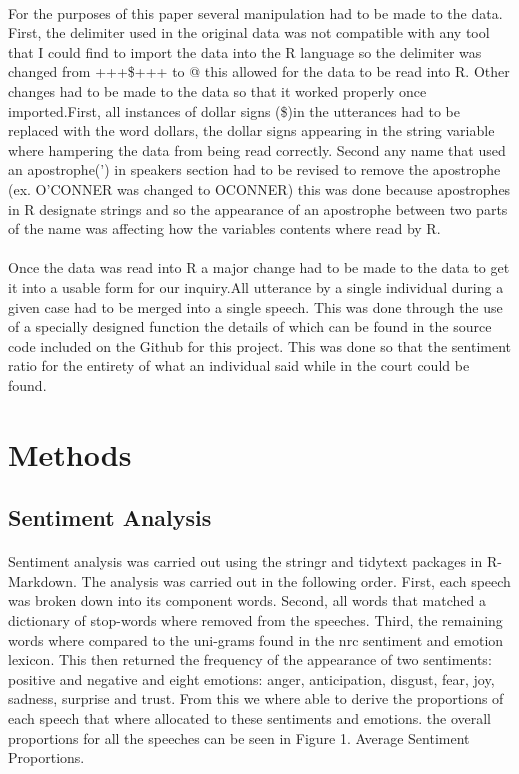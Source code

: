 \documentclass[12pt,english]{article}
\begin{document}
\paragraph{}
For the purposes of this paper several manipulation had to be made to the data. First, the delimiter used in the original data was not compatible with any tool that I could find to import the data into the R language so the delimiter was changed from +++\$+++ to @ this allowed for the data to be read into R. Other changes had to be made to the data so that it worked properly once imported.First, all instances of dollar signs (\$)in the utterances had to be replaced with the word dollars, the dollar signs appearing in the string variable where hampering the data from being read correctly. Second any name that used an apostrophe(') in speakers section had to be revised to remove the apostrophe (ex. O'CONNER was changed to OCONNER) this was done because apostrophes in R designate strings and so the appearance of an apostrophe between two parts of the name was affecting how the variables contents where read by R.
\paragraph{}
Once the data was read into R a major change had to be made to the data to get it into a usable form for our inquiry.All utterance by a single individual during a given case had to be merged into a single speech. This was done through the use of a specially designed function the details of which can be found in the source code included on the Github for this project. This was done so that the sentiment ratio for the entirety of what an individual said while in the court could be found. 
\section{Methods}
\subsection{Sentiment Analysis}
\paragraph{}
Sentiment analysis was carried out using the stringr and tidytext packages in R-Markdown. The analysis was carried out in the following order. First, each speech was broken down into its component words. Second, all words that matched a dictionary of stop-words where removed from the speeches. Third, the remaining words where compared to the uni-grams found in the nrc sentiment and emotion lexicon. This then returned the frequency of the appearance of two sentiments: positive and negative and eight emotions: anger, anticipation, disgust, fear, joy, sadness, surprise and trust.
From this we where able to derive the proportions of each speech that where allocated to these sentiments and emotions. the overall proportions for all the speeches can be seen in Figure 1. Average Sentiment Proportions. 
\end{document}
